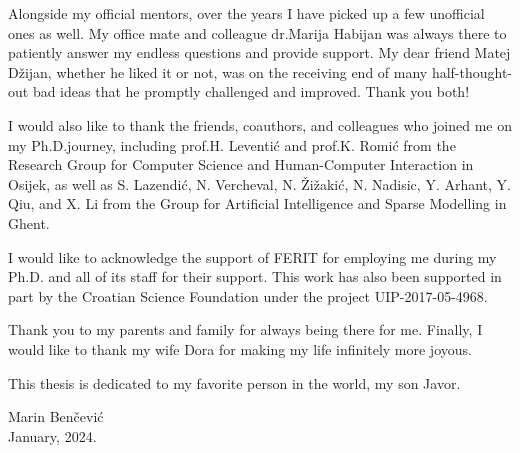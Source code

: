 \begin{acknowledgements}
Alongside my official mentors, over the years I have picked up a few unofficial ones as well. My office mate and colleague dr.\@ Marija Habijan was always there to patiently answer my endless questions and provide support. My dear friend Matej Džijan, whether he liked it or not, was on the receiving end of many half-thought-out bad ideas that he promptly challenged and improved. Thank you both!

I would also like to thank the friends, coauthors, and colleagues who joined me on my Ph.D.\@ journey, including prof.\@ H. Leventić and prof.\@ K. Romić from the Research Group for Computer Science and Human-Computer Interaction in Osijek, as well as S. Lazendić, N. Vercheval, N. Žižakić, N. Nadisic, Y. Arhant, Y. Qiu, and X. Li from the Group for Artificial Intelligence and Sparse Modelling in Ghent. 

I would like to acknowledge the support of FERIT for employing me during my Ph.D. and all of its staff for their support. This work has also been supported in part by the Croatian Science Foundation under the project UIP-2017-05-4968.

Thank you to my parents and family for always being there for me. Finally, I would like to thank my wife Dora for making my life infinitely more joyous. 

This thesis is dedicated to my favorite person in the world, my son Javor.

\setlength{\epigraphwidth}{0.3\textwidth}
\renewcommand{\epigraphflush}{flushright}
 \epigraph{
Marin Benčević\\
January, 2024.
}{}
\end{acknowledgements}
